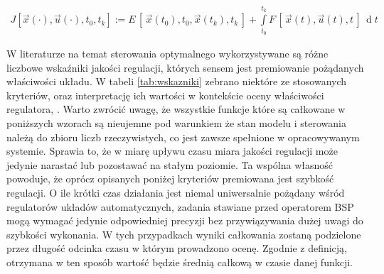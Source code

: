 \begin{align}
    \label{eq:pontryagin}
    J[\vec{x}(\cdot), \vec{u}(\cdot), t_0, t_k] :=E\,[\,\vec{x}(t_0),t_0,\vec{x}(t_k),t_k\,] + \int\limits_{t_0}^{t_k} F\,[\,\vec{x}(t),\vec{u}(t),t\,] \,\operatorname{d}t
\end{align}

W literaturze na temat sterowania optymalnego wykorzystywane są różne liczbowe wskaźniki jakości regulacji, których sensem jest premiowanie pożądanych właściwości układu. W tabeli \ref{tab:wskazniki} zebrano niektóre ze stosowanych kryteriów, oraz interpretację ich wartości w kontekście oceny właściwości regulatora\cite{tan2004}, \cite{kaczorek2015}. Warto zwrócić uwagę, że wszystkie funkcje które są całkowane w poniższych wzorach są nieujemne pod warunkiem że stan modelu i sterowania należą do zbioru liczb rzeczywistych, co jest zawsze spełnione w opracowywanym systemie. Sprawia to, że w miarę upływu czasu miara jakości regulacji może jedynie narastać lub pozostawać na stałym poziomie. Ta wspólna własność powoduje, że oprócz opisanych poniżej kryteriów premiowana jest szybkość regulacji. O ile krótki czas działania jest niemal uniwersalnie pożądany wśród regulatorów układów automatycznych, zadania stawiane przed operatorem BSP mogą wymagać jedynie odpowiedniej precyzji bez przywiązywania dużej uwagi do szybkości wykonania. W tych przypadkach wyniki całkowania zostaną podzielone przez długość odcinka czasu w którym prowadzono ocenę. Zgodnie z definicją, otrzymana w ten sposób wartość będzie średnią całkową w czasie danej funkcji.

